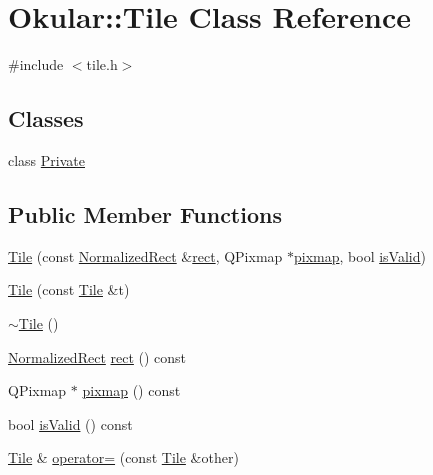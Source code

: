 \hypertarget{classOkular_1_1Tile}{\section{Okular\+:\+:Tile Class Reference}
\label{classOkular_1_1Tile}
}


{\ttfamily \#include $<$tile.\+h$>$}

\subsection*{Classes}
\begin{DoxyCompactItemize}
\item 
class \hyperlink{classTile_1_1Private}{Private}
\end{DoxyCompactItemize}
\subsection*{Public Member Functions}
\begin{DoxyCompactItemize}
\item 
\hyperlink{classOkular_1_1Tile_a9c5b8828ceb40cc2edb87b60d610bc71}{Tile} (const \hyperlink{classOkular_1_1NormalizedRect}{Normalized\+Rect} \&\hyperlink{classOkular_1_1Tile_af98992ebbaa390a12a942bff6c246fca}{rect}, Q\+Pixmap $\ast$\hyperlink{classOkular_1_1Tile_ad20431332cb0fb2844fa2238cc728a9f}{pixmap}, bool \hyperlink{classOkular_1_1Tile_a45926c52fd6e31590fb2c7b293d3b59f}{is\+Valid})
\item 
\hyperlink{classOkular_1_1Tile_a34eb07f7b32114156d8192869dabe242}{Tile} (const \hyperlink{classOkular_1_1Tile}{Tile} \&t)
\item 
\hyperlink{classOkular_1_1Tile_a98634abbd93fa13d0578d7103202d03d}{$\sim$\+Tile} ()
\item 
\hyperlink{classOkular_1_1NormalizedRect}{Normalized\+Rect} \hyperlink{classOkular_1_1Tile_af98992ebbaa390a12a942bff6c246fca}{rect} () const 
\item 
Q\+Pixmap $\ast$ \hyperlink{classOkular_1_1Tile_ad20431332cb0fb2844fa2238cc728a9f}{pixmap} () const 
\item 
bool \hyperlink{classOkular_1_1Tile_a45926c52fd6e31590fb2c7b293d3b59f}{is\+Valid} () const 
\item 
\hyperlink{classOkular_1_1Tile}{Tile} \& \hyperlink{classOkular_1_1Tile_acc5df2d0a1a54b014b0246620e4a59ed}{operator=} (const \hyperlink{classOkular_1_1Tile}{Tile} \&other)
\end{DoxyCompactItemize}


